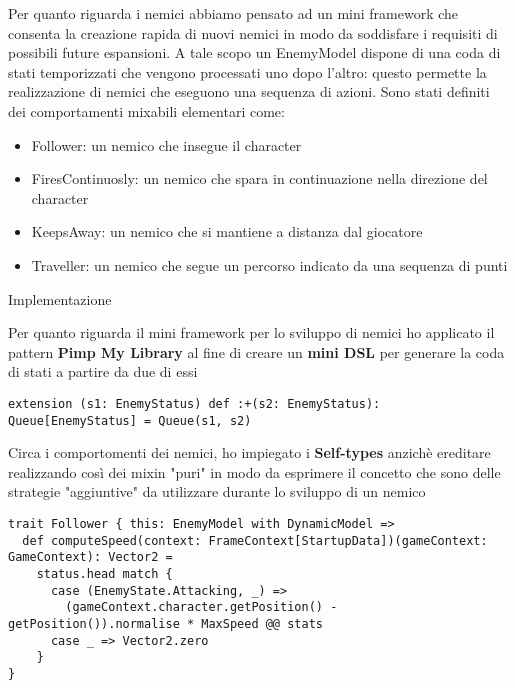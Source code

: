 Per quanto riguarda i nemici abbiamo pensato ad un mini framework che consenta la creazione rapida di nuovi nemici in modo da soddisfare i requisiti di possibili future espansioni.
A tale scopo un EnemyModel dispone di una coda di stati temporizzati che vengono processati uno dopo l'altro: questo permette la realizzazione di nemici che eseguono una sequenza di azioni.
Sono stati definiti dei comportamenti mixabili elementari come:
\begin{itemize}
    \item Follower: un nemico che insegue il character
    \item FiresContinuosly: un nemico che spara in continuazione nella direzione del character
    \item KeepsAway: un nemico che si mantiene a distanza dal giocatore
    \item Traveller: un nemico che segue un percorso indicato da una sequenza di punti
\end{itemize}

Implementazione

Per quanto riguarda il mini framework per lo sviluppo di nemici ho applicato il pattern \textbf{Pimp My Library} al fine di creare un \textbf{mini DSL} per generare la coda di stati a partire da due di essi 

\begin{lstlisting}[basicstyle=\tiny]
extension (s1: EnemyStatus) def :+(s2: EnemyStatus): Queue[EnemyStatus] = Queue(s1, s2)
\end{lstlisting} 

Circa i comportomenti dei nemici, ho impiegato i \textbf{Self-types} anzichè ereditare realizzando così dei mixin "puri" in modo da esprimere il concetto che sono delle strategie "aggiuntive" da utilizzare durante lo sviluppo di un nemico
\begin{lstlisting}[basicstyle=\tiny]
trait Follower { this: EnemyModel with DynamicModel =>
  def computeSpeed(context: FrameContext[StartupData])(gameContext: GameContext): Vector2 =
    status.head match {
      case (EnemyState.Attacking, _) =>
        (gameContext.character.getPosition() - getPosition()).normalise * MaxSpeed @@ stats
      case _ => Vector2.zero
    }
}
\end{lstlisting} 

